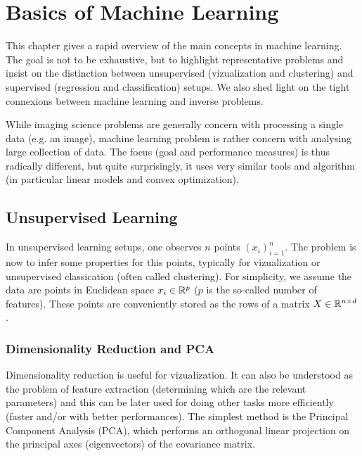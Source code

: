 
\chapter{Basics of Machine Learning}



This chapter gives a rapid overview of the main concepts in machine learning. The goal is not to be exhaustive, but to highlight representative problems and insist on the distinction between unsupervised (vizualization and clustering) and supervised (regression and classification) setups. We also shed light on the tight connexions between machine learning and inverse problems.

While imaging science problems are generally concern with processing a single data (e.g. an image), machine learning problem is rather concern with analysing large collection of data. The focus (goal and performance measures) is thus radically different, but quite surprisingly, it uses very similar tools and algorithm (in particular linear models and convex optimization). 


\section{Unsupervised Learning}

In unsupervised learning setups, one observes $n$ points $(x_i)_{i=1}^n$. 
%
The problem is now to infer some properties for this points, typically for vizualization or unsupervised classication (often called clustering). 
%
For simplicity, we assume the data are points in Euclidean space $x_i \in \mathbb{R}^p$ ($p$ is the so-called number of features). These points are conveniently stored as the rows of a matrix $X \in \mathbb{R}^{n \times d}$.


\subsection{Dimensionality Reduction and PCA}

Dimensionality reduction is useful for vizualization. It can also be understood as the problem of feature extraction (determining which are the relevant parameters) and this can be later used for doing other tasks more efficiently (faster and/or with better performances). 
%
The simplest method is the Principal Component Analysis (PCA),  which performs an orthogonal linear projection on the principal axes (eigenvectors) of the covariance matrix.

